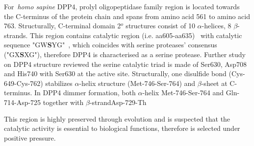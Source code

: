 For~\textit{homo sapine} DPP4, prolyl oligopeptidase family region is located towards the C-terminus of the protein chain and spans from amino acid 561 to amino acid 763. Structurally, C-terminal domain 2$^{o}$ structures consist of 10 $\alpha$-helices, 8 $\beta$-strands. This region contains catalytic region (i.e. aa605-aa635)~\cite{Rawlings1991,Barrett1992,Polgár1992,Rawlings1994} with catalytic sequence "GW\textbf{S}YG"~\cite{Ogata_1992}, which coincides with serine proteases' consensus ("GX\textbf{S}XG"), therefore DPP4 is characterised as a serine protease. Further study on DPP4 structure reviewed the serine catalytic triad is made of Ser630, Asp708 and His740 with Ser630 at the active site. Structurally, one disulfide bond (Cys-649-Cys-762) stabilizes $\alpha$-helix structure (Met-746-Ser-764) and $\beta$-sheet at C-terminus. In DPP4 dimmer formation, both $\alpha$-helix Met-746-Ser-764 and Gln-714-Asp-725 together with $\beta$-strandAsp-729-Th
\par
This region is highly preserved through evolution and is suspected that the catalytic activity is essential to biological functions, therefore is selected under positive pressure. 